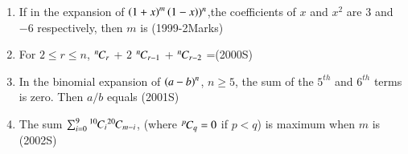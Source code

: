 \documentclass[journal]{IEEEtran}
\begin{document}
\begin{enumerate}
\begin{enumerate}
\end{enumerate}
\item If in the expansion of $\left(1+x\right)^m\left(1-x\right))^n$,the coefficients of $x$ and $x^2$ are $3$ and $-6$ respectively, then $m$ is
\hfill(1999-2Marks)
\begin{enumerate}
\end{enumerate}
\item For $2\leq r\leq n$, ${{}^{n}\mkern-1muC_{r}}$ + $2$ ${{}^{n}\mkern-1muC_{r-1}}$ + ${{}^{n}\mkern-1muC_{r-2}}$ =\hfill(2000S)
\begin{enumerate}
\end{enumerate}
\item In the binomial expansion of $\left(a-b\right)^n$, $n\geq 5$, the sum of  the $5^{th}$ and $6^{th}$ terms is zero. Then $a/b$  equals
\hfill(2001S)
\begin{enumerate}
\end{enumerate}
\item The sum $\sum_{i=0}^{9} {{}^{10}\mkern-1muC_{i}}{{}^{20}\mkern-1muC_{m-i}}$, 
 (where ${{}^{p}\mkern-1muC_{q}}=0$ if {
$p<q$)} is maximum when $m$ is \hfil(2002S)
\begin{enumerate}
\begin{multicols}{2}

\end{multicols}
\end{enumerate}
\end{enumerate}
\end{document}
